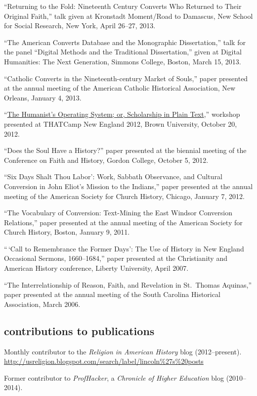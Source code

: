 \documentclass[11pt]{article}
\begin{document}
``Returning to the Fold: Nineteenth Century Converts Who Returned to
Their Original Faith,'' talk given at Kronstadt Moment/Road to Damascus,
New School for Social Research, New York, April 26--27, 2013.

``The American Converts Database and the Monographic Dissertation,''
talk for the panel ``Digital Methods and the Traditional Dissertation,''
given at Digital Humanities: The Next Generation, Simmons College,
Boston, March 15, 2013.

``Catholic Converts in the Nineteenth-century Market of Souls,'' paper
presented at the annual meeting of the American Catholic Historical
Association, New Orleans, January 4, 2013.

``\href{/workshops/}{The Humanist's Operating System; or, Scholarship in
Plain Text},'' workshop presented at THATCamp New England 2012, Brown
University, October 20, 2012.

``Does the Soul Have a History?'' paper presented at the biennial
meeting of the Conference on Faith and History, Gordon College, October
5, 2012.

``Six Days Shalt Thou Labor': Work, Sabbath Observance, and Cultural
Conversion in John Eliot's Mission to the Indians,'' paper presented at
the annual meeting of the American Society for Church History, Chicago,
January 7, 2012.

``The Vocabulary of Conversion: Text-Mining the East Windsor Conversion
Relations,'' paper presented at the annual meeting of the American
Society for Church History, Boston, January 9, 2011.

``\,`Call to Remembrance the Former Days': The Use of History in New
England Occasional Sermons, 1660--1684,'' paper presented at the
Christianity and American History conference, Liberty University, April
2007.

``The Interrelationship of Reason, Faith, and Revelation in St.~Thomas
Aquinas,'' paper presented at the annual meeting of the South Carolina
Historical Association, March 2006.

\subsection{contributions to
publications}\label{contributions-to-publications}

Monthly contributor to the \emph{Religion in American History} blog (2012--present). \url{http://usreligion.blogspot.com/search/label/lincoln\%27s\%20posts}

Former contributor to \emph{ProfHacker}, a \emph{Chronicle of Higher 
  Education} blog (2010--2014). 
\end{document}
